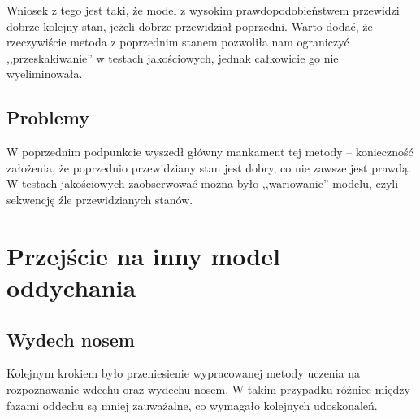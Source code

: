 \documentclass[polish]{article}
\begin{document}
Wniosek z tego jest taki, że model
z wysokim prawdopodobieństwem przewidzi dobrze kolejny stan, jeżeli dobrze przewidział poprzedni. 
Warto dodać, że rzeczywiście metoda z poprzednim stanem pozwoliła nam ograniczyć ,,przeskakiwanie'' 
w testach jakościowych, jednak całkowicie go nie wyeliminowała.
\subsection{Problemy}
W poprzednim podpunkcie wyszedł główny mankament tej metody -- konieczność założenia, że poprzednio
przewidziany stan jest dobry, co nie zawsze jest prawdą. W testach jakościowych zaobserwować można było
,,wariowanie'' modelu, czyli sekwencję źle przewidzianych stanów.

\section{Przejście na inny model oddychania}
\subsection{Wydech nosem}
Kolejnym krokiem było przeniesienie wypracowanej metody uczenia na rozpoznawanie wdechu oraz wydechu nosem. W takim przypadku różnice między fazami oddechu są mniej zauważalne, co wymagało kolejnych udoskonaleń.
\end{document}
